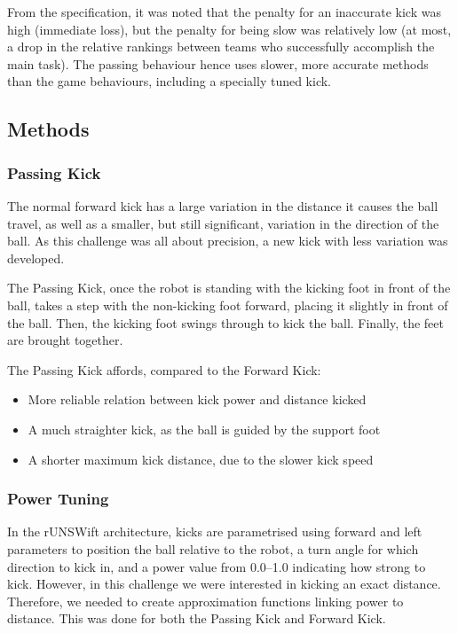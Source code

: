 \documentclass[pdftex,11pt,a4paper]{report}
\begin{document}
From the specification, it was noted that the penalty for an inaccurate
kick was high (immediate loss), but the penalty for being slow was
relatively low (at most, a drop in the relative rankings between teams who
successfully accomplish the main task). The passing behaviour hence uses
slower, more accurate methods than the game behaviours, including a
specially tuned kick.

\subsection{Methods}
\subsubsection{Passing Kick} \label{sectionPassingKick}
The normal forward kick has a large variation in the distance it causes the
ball travel, as well as a smaller, but still significant, variation in the
direction of the ball. As this challenge was all about precision, a new
kick with less variation was developed.

The Passing Kick, once the robot is standing with the kicking foot in front
of the ball, takes a step with the non-kicking foot forward, placing it
slightly in front of the ball. Then, the kicking foot swings through to
kick the ball. Finally, the feet are brought together.

The Passing Kick affords, compared to the Forward Kick:
\begin{itemize}
   \item More reliable relation between kick power and distance kicked
   \item A much straighter kick, as the ball is guided by the support foot
   \item A shorter maximum kick distance, due to the slower kick speed
\end{itemize}

\subsubsection{Power Tuning}
In the rUNSWift architecture, kicks are parametrised using forward and left
parameters to position the ball relative to the robot, a turn angle for
which direction to kick in, and a power value from 0.0--1.0 indicating how
strong to kick. However, in this challenge we were interested in kicking an
exact distance. Therefore, we needed to create approximation functions
linking power to distance. This was done for both the Passing Kick and
Forward Kick.
\end{document}

